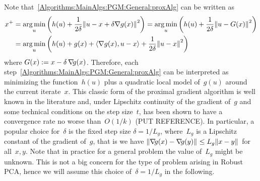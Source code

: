 \documentclass{../../common/projectreport}
\begin{document}
Note that~\eqref{Algorithms:MainAlgs:PGM:General:proxAlg} can be written as
%
\begin{align}
\begin{split}
x^+ &= \operatorname*{arg\,min}_u \left( h(u) + \frac{1}{2\delta}{\left\|u-x+\delta\nabla g(x)\right\|}_{}^{2} \right) = \operatorname*{arg\,min}_u \left( h(u) +\frac{1}{2\delta} {\left\|u-G(x)\right\|}_{}^{2} \right) \\
&= \operatorname*{arg\,min}_u \left( h(u) +g(x) + \langle \nabla g(x),u-x\rangle + \frac{1}{2\delta}{\left\|u-x\right\|}_{}^{2} \right)
\end{split}
\label{Algorithms:MainAlgs:PGM:General:proxAlgRewritten}
\end{align}
%
where $G(x) := x-\delta\operatorname{\nabla\!\!} g(x)$. Therefore, each step~\eqref{Algorithms:MainAlgs:PGM:General:proxAlg} can be interpreted as minimizing the function~$h(u)$ plus a quadratic local model of~$g(u)$ around the current iterate~$x$. This classic form of the proximal gradient algorithm is well known in the literature and, under Lipschitz continuity of the gradient of~$g$ and some technical conditions on the step size~$t$, has been shown to have a convergence rate no worse than~$O(1/k)$ (PUT REFERENCE). In particular, a popular choice for~$\delta$ is the fixed step size $\delta = 1/L_g$, where~$L_g$ is a Lipschitz constant of the gradient of~$g$, that is we have ${\left\|\operatorname{\nabla\!\!} g(x) -\operatorname{\nabla\!\!} g(y)\right\|}_{}^{} \leq L_g {\left\|x-y\right\|}_{}^{}$ for all~$x,y$. Note that in practice for a general problem the value of~$L_g$ might be unknown. This is not a big concern for the type of problem arising in Robust PCA, hence we will assume this choice of~$\delta=1/L_g$ in the following.
\end{document}
